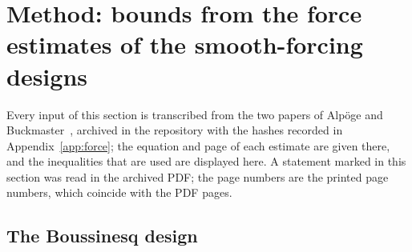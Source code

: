 \documentclass[11pt]{article}
\theoremstyle{remark}
\newcommand{\ev}[1]{\hspace{0.2em}{\small\textsf{[#1]}}}
\begin{document}
\section{Method: bounds from the force estimates of the smooth-forcing designs}\label{sec:design}

Every input of this section is transcribed from the two papers of Alp\"oge and
Buckmaster~\cite{ab-boussinesq,ab-euler}, archived in the repository with the hashes recorded in
Appendix~\ref{app:force}; the equation and page of each estimate are given there, and the
inequalities that are used are displayed here. A statement marked \ev{V} in this section was read in
the archived PDF; the page numbers are the printed page numbers, which coincide with the PDF pages.

\subsection{The Boussinesq design}\label{sec:boussinesq}
\end{document}
